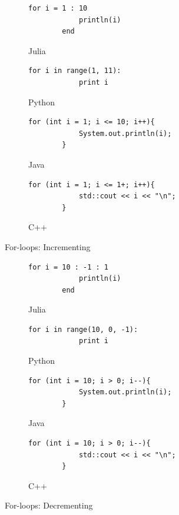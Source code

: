 \documentclass[a4paper, 11pt, titlepage]{article}
\begin{document}
\begin{figure}[H]
	\centering
	\begin{subfigure}[H]{0.7\textwidth}
		\centering
		\begin{lstlisting}[belowskip=0.5mm]
		for i = 1 : 10
			println(i)
		end
		\end{lstlisting}
		\caption{Julia}
	\end{subfigure}
	\begin{subfigure}[H]{0.7\textwidth}
		\centering
		\begin{lstlisting}[belowskip=0.5mm]
		for i in range(1, 11):
			print i
		\end{lstlisting}
		\caption{Python}
	\end{subfigure}	
	\begin{subfigure}[H]{0.7\textwidth}
		\centering
		\begin{lstlisting}[belowskip=0.5mm]
		for (int i = 1; i <= 10; i++){
			System.out.println(i);
		}
		\end{lstlisting}
		\caption{Java}
	\end{subfigure}
	\begin{subfigure}[H]{0.7\textwidth}
		\centering
		\begin{lstlisting}[belowskip=0.5mm]
		for (int i = 1; i <= 1+; i++){
			std::cout << i << "\n";
		}
		\end{lstlisting}
		\caption{C++}
	\end{subfigure}
	\caption{For-loops: Incrementing}
	\label{forloop+}
\end{figure}

\begin{figure}[H]
	\centering
	\begin{subfigure}[H]{0.7\textwidth}
		\centering
		\begin{lstlisting}[belowskip=0.5mm]
		for i = 10 : -1 : 1
			println(i)
		end
		\end{lstlisting}
		\caption{Julia}
	\end{subfigure}
	\begin{subfigure}[H]{0.7\textwidth}
		\centering
		\begin{lstlisting}[belowskip=0.5mm]
		for i in range(10, 0, -1):
			print i
		\end{lstlisting}
		\caption{Python}
	\end{subfigure}	
	\begin{subfigure}[H]{0.7\textwidth}
		\centering
		\begin{lstlisting}[belowskip=0.5mm]
		for (int i = 10; i > 0; i--){
			System.out.println(i);
		}
		\end{lstlisting}
		\caption{Java}
	\end{subfigure}
	\begin{subfigure}[H]{0.7\textwidth}
		\centering
		\begin{lstlisting}[belowskip=0.5mm]
		for (int i = 10; i > 0; i--){
			std::cout << i << "\n";
		}
		\end{lstlisting}
		\caption{C++}
	\end{subfigure}
	\caption{For-loops: Decrementing}
	\label{forloop-}
\end{figure}
\end{document}
